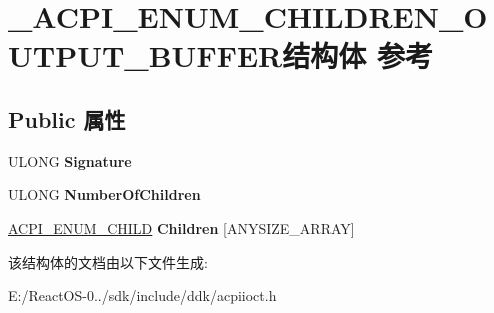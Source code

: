 \hypertarget{struct___a_c_p_i___e_n_u_m___c_h_i_l_d_r_e_n___o_u_t_p_u_t___b_u_f_f_e_r}{}\section{\+\_\+\+A\+C\+P\+I\+\_\+\+E\+N\+U\+M\+\_\+\+C\+H\+I\+L\+D\+R\+E\+N\+\_\+\+O\+U\+T\+P\+U\+T\+\_\+\+B\+U\+F\+F\+E\+R结构体 参考}
\label{struct___a_c_p_i___e_n_u_m___c_h_i_l_d_r_e_n___o_u_t_p_u_t___b_u_f_f_e_r}
\subsection*{Public 属性}
\begin{DoxyCompactItemize}
\item 
\mbox{\label{struct___a_c_p_i___e_n_u_m___c_h_i_l_d_r_e_n___o_u_t_p_u_t___b_u_f_f_e_r_a69fc4b90616cdf08d2783ccc8e94d097}} 
U\+L\+O\+NG {\bfseries Signature}
\item 
\mbox{\label{struct___a_c_p_i___e_n_u_m___c_h_i_l_d_r_e_n___o_u_t_p_u_t___b_u_f_f_e_r_ab44b6e5ce79870faebb4af1ad75c9193}} 
U\+L\+O\+NG {\bfseries Number\+Of\+Children}
\item 
\mbox{\label{struct___a_c_p_i___e_n_u_m___c_h_i_l_d_r_e_n___o_u_t_p_u_t___b_u_f_f_e_r_a7480df7ba92441e065fbdf6d5970a424}} 
\hyperlink{struct___a_c_p_i___e_n_u_m___c_h_i_l_d}{A\+C\+P\+I\+\_\+\+E\+N\+U\+M\+\_\+\+C\+H\+I\+LD} {\bfseries Children} \mbox{[}A\+N\+Y\+S\+I\+Z\+E\+\_\+\+A\+R\+R\+AY\mbox{]}
\end{DoxyCompactItemize}


该结构体的文档由以下文件生成\+:\begin{DoxyCompactItemize}
\item 
E\+:/\+React\+O\+S-\/0../sdk/include/ddk/acpiioct.\+h\end{DoxyCompactItemize}

